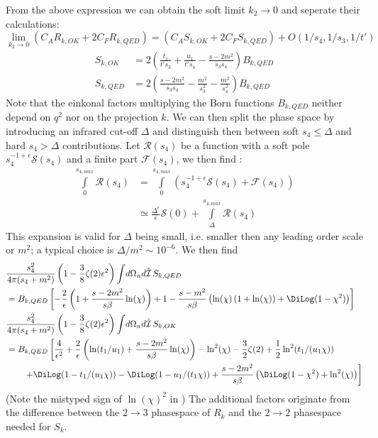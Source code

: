 From the above expression we can obtain the soft limit $k_2\rightarrow 0$ and seperate their calculations:
\begin{equation}
\lim_{k_2\rightarrow 0}\left(C_A R_{k,OK} + 2C_F R_{k,QED}\right) = \left(C_A S_{k,OK} + 2C_F S_{k,QED}\right) + O(1/s_4,1/s_3,1/t')
\end{equation}
\begin{align}
S_{k,OK}  &= 2\left(\frac{t_1}{t's_3} + \frac{u_1}{t's_4}-\frac{s-2m^2}{s_3s_4}\right)B_{k,QED}\\
S_{k,QED} &= 2\left(\frac{s-2m^2}{s_3s_4} - \frac{m^2}{s_3^2} - \frac{m^2}{s_4^2}\right)B_{k,QED}
\end{align}
Note that the einkonal factors multiplying the Born functions $B_{k,QED}$ neither depend on $q^2$ nor on the projection $k$. We can then split the phase space by introducing an infrared cut-off $\Delta$ and distinguish then between soft $s_4\leq \Delta$ and hard $s_4>\Delta$ contributions. Let $\mathcal R(s_4)$ be a function with a soft pole $s_4^{-1+\epsilon}\mathcal S(s_4)$ and a finite part $\mathcal F(s_4)$, we then find \cite{Bojak:2000eu}:
\begin{align}
\int\limits_0^{s_{4,max}} \!\!\mathcal R(s_4) &= \int\limits_0^{s_{4,max}} \!\!\left(s_4^{-1+\epsilon}\mathcal S(s_4) + \mathcal F(s_4)\right)\\
 &\simeq \frac{\Delta^\epsilon}{\epsilon}\mathcal S(0) + \int\limits_\Delta^{s_{4,max}}\!\!\mathcal R(s_4)
\end{align}
This expansion is valid for $\Delta$ being small, i.e. smaller then any leading order scale or $m^2$; a typical choice is $\Delta/m^2 \sim 10^{-6}$. We then find
\begin{align}
&\frac{s_4^2}{4\pi(s_4+m^2)}\left(1-\frac 3 8 \zeta(2)\epsilon^2\right)\int\!d\Omega_n d\hat{\mathcal I}\,S_{k,QED}\nonumber\\
 &= B_{k,QED}\left[-\frac 2 \epsilon\left(1+\frac{s-2m^2}{s\beta}\ln(\chi)\right)
+1 - \frac{s-m^2}{s\beta}\left(\ln(\chi)\left(1+\ln(\chi)\right) + \DiLog(1-\chi^2)\right)
\right] \\
&\frac{s_4^2}{4\pi(s_4+m^2)}\left(1-\frac 3 8 \zeta(2)\epsilon^2\right)\int\!d\Omega_n d\hat{\mathcal I}\,S_{k,OK} \nonumber\\
 &=B_{k,QED}\left[\frac 4 {\epsilon^2} + \frac 2 \epsilon\left(\ln(t_1/u_1)+\frac{s-2m^2}{s\beta}\ln(\chi)\right)-\ln^2(\chi) - \frac 3 2 \zeta(2)+\frac 1 2\ln^2(t_1/(u_1\chi))\right.\nonumber\\
 &\hspace{20pt}\left. +\DiLog(1-t_1/(u_1\chi)) - \DiLog(1-u_1/(t_1\chi)) + \frac{s-2m^2}{s\beta}\left(
\DiLog(1-\chi^2)+\ln^2(\chi)
\right) \right]
\end{align}
(Note the mistyped sign of $\ln(\chi)^2$ in \cite[eq. (3.25)]{Laenen1993162}) The additional factors originate from the difference between the $2\rightarrow 3$ phasespace of $R_{k}$ and the $2\rightarrow 2$ phasespace needed for $S_k$.

